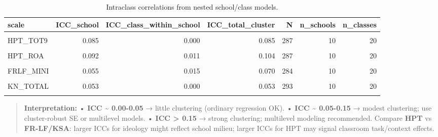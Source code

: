 \documentclass[
  10pt,
]{article}
\begin{document}
\begin{longtable}[t]{lrrrrrr}
\caption{\label{tab:icc-table}Intraclass correlations from nested school/class models.}\\
\toprule
scale & ICC\_school & ICC\_class\_within\_school & ICC\_total\_cluster & N & n\_schools & n\_classes\\
\midrule
\cellcolor{gray!10}{HPT\_CTX6} & \cellcolor{gray!10}{0.041} & \cellcolor{gray!10}{0.000} & \cellcolor{gray!10}{0.041} & \cellcolor{gray!10}{287} & \cellcolor{gray!10}{10} & \cellcolor{gray!10}{20}\\
HPT\_TOT9 & 0.085 & 0.000 & 0.085 & 287 & 10 & 20\\
\cellcolor{gray!10}{HPT\_POP} & \cellcolor{gray!10}{0.025} & \cellcolor{gray!10}{0.000} & \cellcolor{gray!10}{0.025} & \cellcolor{gray!10}{287} & \cellcolor{gray!10}{10} & \cellcolor{gray!10}{20}\\
HPT\_ROA & 0.092 & 0.011 & 0.104 & 287 & 10 & 20\\
\cellcolor{gray!10}{HPT\_CONT} & \cellcolor{gray!10}{0.026} & \cellcolor{gray!10}{0.007} & \cellcolor{gray!10}{0.033} & \cellcolor{gray!10}{287} & \cellcolor{gray!10}{10} & \cellcolor{gray!10}{20}\\
\addlinespace
FRLF\_MINI & 0.055 & 0.015 & 0.070 & 284 & 10 & 20\\
\cellcolor{gray!10}{KSA\_TOTAL} & \cellcolor{gray!10}{0.057} & \cellcolor{gray!10}{0.042} & \cellcolor{gray!10}{0.099} & \cellcolor{gray!10}{283} & \cellcolor{gray!10}{10} & \cellcolor{gray!10}{20}\\
KN\_TOTAL & 0.053 & 0.000 & 0.053 & 293 & 10 & 20\\
\cellcolor{gray!10}{SDR\_TOTAL} & \cellcolor{gray!10}{0.000} & \cellcolor{gray!10}{0.000} & \cellcolor{gray!10}{0.000} & \cellcolor{gray!10}{283} & \cellcolor{gray!10}{10} & \cellcolor{gray!10}{20}\\
\bottomrule
\end{longtable}

\begin{quote}
\textbf{Interpretation:} • \textbf{ICC \textasciitilde{} 0.00-0.05} →
little clustering (ordinary regression OK). • \textbf{ICC
\textasciitilde{} 0.05-0.15} → modest clustering; use cluster-robust SE
or multilevel models. • \textbf{ICC \textgreater{} 0.15} → strong
clustering; multilevel modeling recommended. Compare \textbf{HPT} vs
\textbf{FR-LF/KSA}: larger ICCs for ideology might reflect school
milieu; larger ICCs for HPT may signal classroom task/context effects.
\end{quote}
\end{document}
